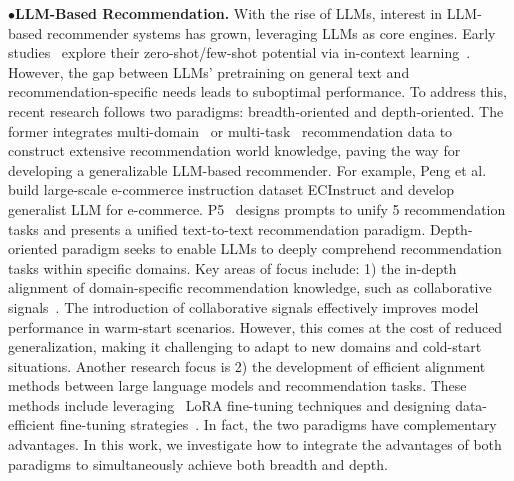 \noindent$\bullet$\quad\textbf{LLM-Based Recommendation.}
With the rise of LLMs, interest in LLM-based recommender systems has grown, leveraging LLMs as core engines. Early studies~\cite{dai2023uncovering,sanner2023large,wang-etal-2023-rethinking-evaluation} explore their zero-shot/few-shot potential via in-context learning~\cite{dong2024survey}. However, the gap between LLMs' pretraining on general text and recommendation-specific needs leads to suboptimal performance. To address this, recent research follows two paradigms: breadth-oriented and depth-oriented.
The former integrates multi-domain~\cite{10.1145/3705727,peng2024ecellm} or multi-task~\cite{geng2022recommendation,10.1145/3708882,cui2022m6,peng2024ecellm} recommendation data to construct extensive recommendation world knowledge, paving the way for developing a generalizable LLM-based recommender. For example, Peng et al.\cite{peng2024ecellm} build large-scale e-commerce instruction dataset ECInstruct and develop generalist LLM for e-commerce. P5~\cite{geng2022recommendation} designs prompts to unify 5 recommendation tasks and presents a unified text-to-text recommendation paradigm.
Depth-oriented paradigm seeks to enable LLMs to deeply comprehend recommendation tasks within specific domains. 
Key areas of focus include: 1) the in-depth alignment of domain-specific recommendation knowledge, such as collaborative signals~\cite{lin2024bridging,10.1145,10.1145/3626772.3657690,10.1145/3589334.3645458,kong2024customizing}.
The introduction of collaborative signals effectively improves model performance in warm-start scenarios. However, this comes at the cost of reduced generalization, making it challenging to adapt to new domains and cold-start situations.
Another research focus is 2) the development of efficient alignment methods between large language models and recommendation tasks. These methods include leveraging~\cite{bao2023tallrec,kong2024customizing} LoRA fine-tuning techniques and designing data-efficient fine-tuning strategies~\cite{10.1145/3626772.3657807, zheng2024harnessing}.
In fact, the two paradigms have complementary advantages. In this work, we investigate how to integrate the advantages of both paradigms to simultaneously achieve both breadth and depth.



\iffalse

